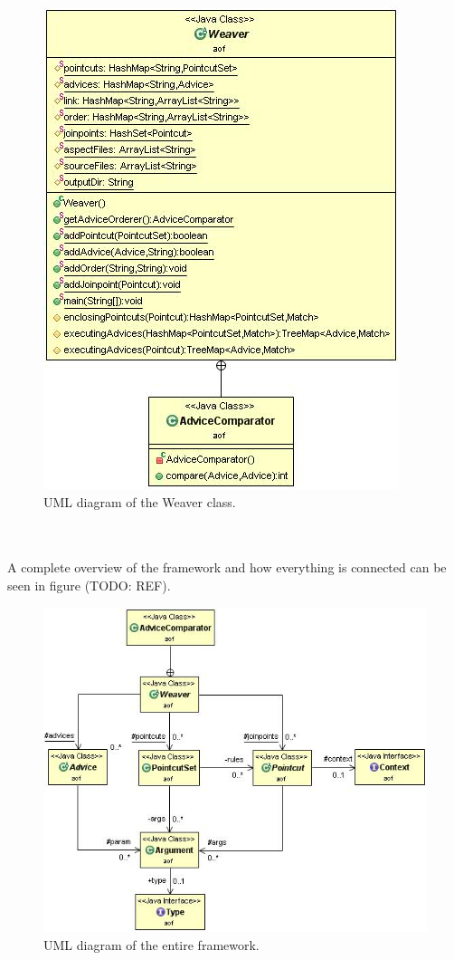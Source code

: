 \documentclass[a4paper]{report}
\begin{document}
\begin{figure}[h!]
\centering
\includegraphics[scale=0.7]{images/AOF/Weaver.jpg}
\caption{UML diagram of the Weaver class.}
\label{fig:Weaver}
\end{figure}\\
\\
A complete overview of the framework and how everything is connected can be seen in figure (TODO: REF).
\begin{figure}
\centering
\includegraphics[scale=0.65]{images/AOF/Full.jpg}
\caption{UML diagram of the entire framework.}
\label{fig:FullView}
\end{figure}
\end{document}

